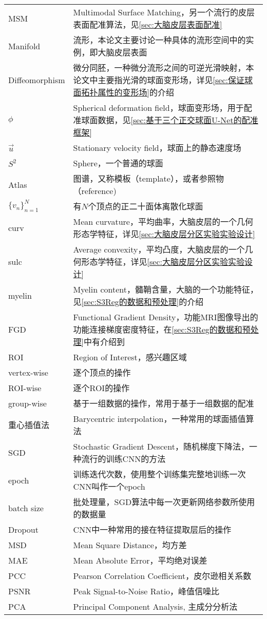 \begin{center}
\begin{longtable}{>{\raggedleft}p{}  p{}}
            MSM & Multimodal Surface Matching，另一个流行的皮层表面配准算法，见\ref{sec:大脑皮层表面配准} \\
            Manifold & 流形，本论文主要讨论一种具体的流形空间中的实例，即大脑皮层表面 \\
            Diffeomorphism & 微分同胚，一种微分流形之间的可逆光滑映射，本论文中主要指光滑的球面变形场，详见\ref{sec:保证球面拓扑属性的变形场}的介绍 \\
            $\phi$  & Spherical deformation field，球面变形场，用于配准球面数据，见\ref{sec:基于三个正交球面U-Net的配准框架} \\
            $\overrightarrow{u}$ &  Stationary velocity field，球面上的静态速度场 \\
            $S^2$ & Sphere，一个普通的球面 \\
            Atlas & 图谱，又称模板（template），或者参照物（reference) \\
            ${\{v_n\}}_{n=1}^N$ & 有$N$个顶点的正二十面体离散化球面 \\
            curv      &    Mean curvature，平均曲率，大脑皮层的一个几何形态学特征，详见\ref{sec:大脑皮层分区实验实验设计} \\
            sulc      & Average convexity，平均凸度，大脑皮层的一个几何形态学特征，详见\ref{sec:大脑皮层分区实验实验设计} \\
            myelin   & Myelin content，髓鞘含量，大脑的一个功能特征，见\ref{sec:S3Reg的数据和预处理}的介绍 \\
            FGD     & Functional Gradient Density，功能MRI图像导出的功能连接梯度密度特征，在\ref{sec:S3Reg的数据和预处理}中有介绍到 \\
            ROI    &  Region of Interest，感兴趣区域 \\
            vertex-wise &  逐个顶点的操作 \\
            ROI-wise &  逐个ROI的操作 \\
            group-wise & 基于一组数据的操作，常用于基于一组数据的配准 \\
            重心插值法 & Barycentric interpolation，一种常用的球面插值算法 \\
            SGD  & Stochastic Gradient Descent，随机梯度下降法，一种流行的训练CNN的方法 \\
            epoch & 训练迭代次数，使用整个训练集完整地训练一次CNN叫作一个epoch \\
            batch size & 批处理量，SGD算法中每一次更新网络参数所使用的数据量   \\
            Dropout & CNN中一种常用的接在特征提取层后的操作 \\
            MSD  & Mean Square Distance，均方差 \\
            MAE & Mean Absolute Error，平均绝对误差 \\
            PCC  & Pearson Correlation Coefficient，皮尔逊相关系数 \\
            PSNR & Peak Signal-to-Noise Ratio，峰值信噪比 \\
            PCA & Principal Component Analysis, 主成分分析法 \\
    \end{longtable}
\end{center}
